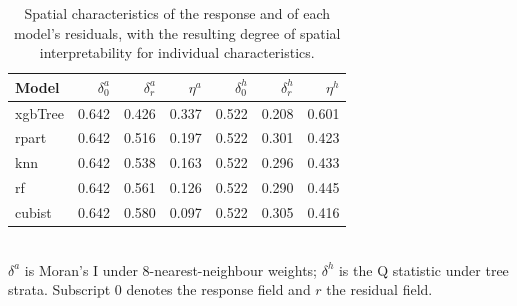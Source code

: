 \begin{table}[htbp]
\centering
\caption{Spatial characteristics of the response and of each model's residuals, with the resulting degree of spatial interpretability for individual characteristics.}
\label{tab:dsi}
\begin{tabular}{lrrrrrr}
\hline
\textbf{Model} & \textbf{$\delta^a_0$} & \textbf{$\delta^a_r$} & \textbf{$\eta^a$} & \textbf{$\delta^h_0$} & \textbf{$\delta^h_r$} & \textbf{$\eta^h$} \\
\hline
xgbTree & 0.642 & 0.426 & 0.337 & 0.522 & 0.208 & 0.601 \\
rpart & 0.642 & 0.516 & 0.197 & 0.522 & 0.301 & 0.423 \\
knn & 0.642 & 0.538 & 0.163 & 0.522 & 0.296 & 0.433 \\
rf & 0.642 & 0.561 & 0.126 & 0.522 & 0.290 & 0.445 \\
cubist & 0.642 & 0.580 & 0.097 & 0.522 & 0.305 & 0.416 \\
\hline
\end{tabular}
\\[2pt]\footnotesize $\delta^a$ is Moran's I under 8-nearest-neighbour weights; $\delta^h$ is the Q statistic under tree strata. Subscript 0 denotes the response field and $r$ the residual field.
\end{table}
